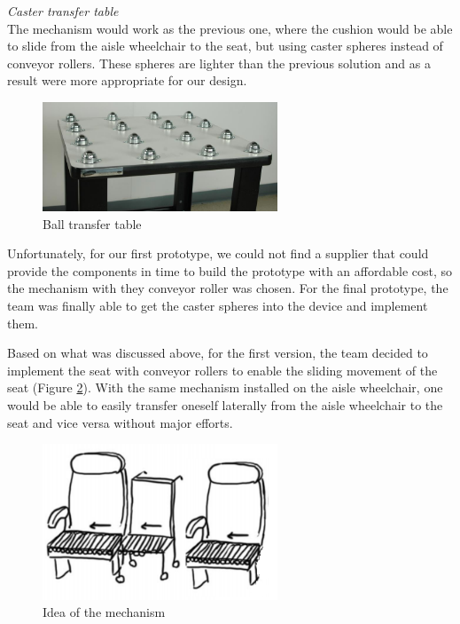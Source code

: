 \noindent\emph{Caster transfer table}\\
The mechanism would work as the previous one, where the cushion would be able to slide from the aisle wheelchair to the seat, but using caster spheres instead of conveyor rollers. These spheres are lighter than the previous solution and as a result were more appropriate for our design.

\begin{figure}[h]
\centering
\includegraphics[width=7cm]{brazil_images/image037.jpg}
\caption{Ball transfer table}%
\label{fig:ball_transfer}
\end{figure}

Unfortunately, for our first prototype, we could not find a supplier that could provide the components in time to build the prototype with an affordable cost, so the mechanism with they conveyor roller was chosen. For the final prototype, the team was finally able to get the caster spheres into the device and implement them.

Based on what was discussed above, for the first version, the team decided to implement the seat with conveyor rollers to enable the sliding movement of the seat (Figure \ref{fig:idea_mechanism}). With the same mechanism installed on the aisle wheelchair, one would be able to easily transfer oneself laterally from the aisle wheelchair to the seat and vice versa without major efforts.

\begin{figure}[h]
\centering
\includegraphics[width=7cm]{brazil_images/image038.png}
\caption{Idea of the mechanism}
\label{fig:idea_mechanism}
\end{figure}


